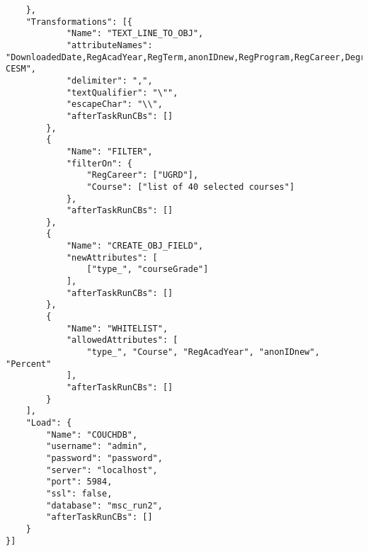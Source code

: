 \begin{verbatim}
    },
    "Transformations": [{
            "Name": "TEXT_LINE_TO_OBJ",
            "attributeNames": "DownloadedDate,RegAcadYear,RegTerm,anonIDnew,RegProgram,RegCareer,Degree,DegreeDescr,Subject,Catalog.,Course,CourseSuffix,Session,Percent,Symbol,UnitsTaken,CourseID,CourseDescr,CourseCareer,Faculty,Dept,MaximumCrseUnits,CourseCount,CourseLevel,CESM,Sub-CESM",
            "delimiter": ",",
            "textQualifier": "\"",
            "escapeChar": "\\",
            "afterTaskRunCBs": []
        },
        {
            "Name": "FILTER",
            "filterOn": {
                "RegCareer": ["UGRD"],
                "Course": ["list of 40 selected courses"]
            },
            "afterTaskRunCBs": []
        },
        {
            "Name": "CREATE_OBJ_FIELD",
            "newAttributes": [
                ["type_", "courseGrade"]
            ],
            "afterTaskRunCBs": []
        },
        {
            "Name": "WHITELIST",
            "allowedAttributes": [
                "type_", "Course", "RegAcadYear", "anonIDnew", "Percent"
            ],
            "afterTaskRunCBs": []
        }
    ],
    "Load": {
        "Name": "COUCHDB",
        "username": "admin",
        "password": "password",
        "server": "localhost",
        "port": 5984,
        "ssl": false,
        "database": "msc_run2",
        "afterTaskRunCBs": []
    }
}]
\end{verbatim}

